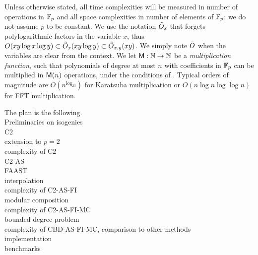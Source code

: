 Unless otherwise stated, all time complexities will be measured in
number of operations in $\mathbb{F}_p$ and all space complexities in number of
elements of $\mathbb{F}_p$; we do not assume $p$ to be constant. We use the
notation $\tilde{O}_x$ that forgets polylogarithmic factors in the
variable $x$, thus $O(xy\log x \log y)\subset\tilde{O}_x(xy\log
y)\subset\tilde{O}_{x,y}(xy)$. We simply note $\tilde{O}$ when the variables
are clear from the context. We let $\mathrm{\sf M}:\mathbb{N}\rightarrow\mathbb{N}$ be a
\emph{multiplication function}, such that polynomials of degree at
most $n$ with coefficients in $\mathbb{F}_p$ can be multiplied in $\mathrm{\sf M}(n)$
operations, under the conditions of \cite[Ch. 8.3]{vzGG}. Typical
orders of magnitude are $O(n^{\log_23})$ for Karatsuba multiplication
or $O(n\log n\log\log n)$ for FFT multiplication.

The plan is the following.\\
Preliminaries on isogenies\\
C2\\
extension to $p=2$\\
complexity of C2\\
C2-AS\\
FAAST\\
interpolation\\
complexity of C2-AS-FI\\
modular composition\\
complexity of C2-AS-FI-MC\\
bounded degree problem\\
complexity of CBD-AS-FI-MC, comparison to other methods\\
implementation\\
benchmarks\\



%
